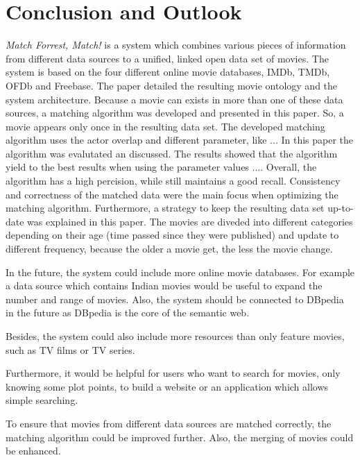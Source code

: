 \section{Conclusion and Outlook}
\label{sec_conclusion}

\emph{Match Forrest, Match!} is a system which combines various pieces of information from different data sources to a unified, linked open data set of movies.
The system is based on the four different online movie databases, IMDb, TMDb, OFDb and Freebase.
The paper detailed the resulting movie ontology and the system architecture.
Because a movie can exists in more than one of these data sources, a matching algorithm was developed and presented in this paper.
So, a movie appears only once in the resulting data set.
The developed matching algorithm uses the actor overlap and different parameter, like ...
In this paper the algorithm was evalutated an discussed.
The results showed that the algorithm yield to the best results when using the parameter values ....
Overall, the algorithm has a high percision, while still maintains a good recall.
Consistency and correctness of the matched data were the main focus when optimizing the matching algorithm.
Furthermore, a strategy to keep the resulting data set up-to-date was explained in this paper.
The movies are diveded into different categories depending on their age (time passed since they were published) and update to different frequency, because the older a movie get, the less the movie change.

In the future, the system could include more online movie databases.
For example a data source which contains Indian movies would be useful to expand the number and range of movies.
Also, the system should be connected to DBpedia in the future as DBpedia is the core of the semantic web.

Besides, the system could also include more resources than only feature movies, such as TV films or TV series.

Furthermore, it would be helpful for users who want to search for movies, only knowing some plot points, to build a website or an application which allows simple searching.

To ensure that movies from different data sources are matched correctly, the matching algorithm could be improved further.
Also, the merging of movies could be enhanced.